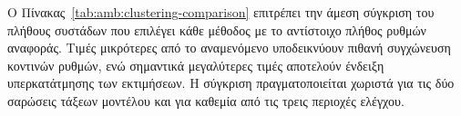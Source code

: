 \clearpage
\begin{landscape}
\vspace*{0.06\textheight}
\noindent\begin{minipage}{0.98\linewidth}
Ο Πίνακας~\ref{tab:amb:clustering-comparison} επιτρέπει την άμεση σύγκριση του πλήθους συστάδων που επιλέγει κάθε μέθοδος με το αντίστοιχο πλήθος ρυθμών αναφοράς. Τιμές μικρότερες από το αναμενόμενο υποδεικνύουν πιθανή συγχώνευση κοντινών ρυθμών, ενώ σημαντικά μεγαλύτερες τιμές αποτελούν ένδειξη υπερκατάτμησης των εκτιμήσεων. Η σύγκριση πραγματοποιείται χωριστά για τις δύο σαρώσεις τάξεων μοντέλου και για καθεμία από τις τρεις περιοχές ελέγχου.
\end{minipage}
\vspace{1.5em}
\begin{table}[H]
    \centering
    \caption{Πλήθος συστάδων της επιλεγμένης ρύθμισης ανά σάρωση τάξεων μοντέλου, περιοχή ελέγχου και μέθοδο.}
    \label{tab:amb:clustering-comparison}
\end{table}
\vspace*{\fill}
\end{landscape}
\clearpage

